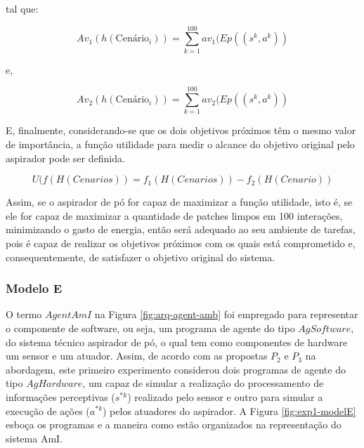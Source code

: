 tal que:

\[
Av_1(h(\textrm{Cenário}_i)) =  \sum_{k=1}^{100}av_1(Ep((s^k, a^k))
\]

e, 

\[
Av_2(h(\textrm{Cenário}_i)) = \sum_{k=1}^{100}av_2(Ep((s^k, a^k))
\]

E, finalmente, considerando-se que os dois objetivos próximos têm o mesmo valor de importância, a função utilidade para medir o alcance do objetivo original pelo aspirador pode ser definida.

\[ U(f(H(Cenarios)) = f_1(H(Cenarios)) - f_2(H(Cenario))\]

Assim, se o aspirador de pó for capaz de maximizar a função utilidade, isto é, se ele for capaz de maximizar a quantidade de patches limpos em 100 interações, minimizando o gasto de energia, então será adequado ao seu ambiente de tarefas, pois é capaz de realizar os objetivos próximos com os quais está comprometido e, consequentemente, de satisfazer o objetivo original do sistema.

\subsubsection{Modelo E}

O termo $AgentAmI$ na Figura \ref{fig:arq-agent-amb} foi empregado para representar o componente de software, ou seja, um programa de agente do tipo $AgSoftware$, do sistema técnico aspirador de pó, o qual tem como componentes de hardware um sensor e um atuador. Assim, de acordo com as propostas $P_2$ e $P_3$ na abordagem, este primeiro experimento considerou dois programas de agente do tipo $AgHardware$, um capaz de simular a realização do processamento de informações perceptivas ($s^{*k}$) realizado pelo sensor e outro para simular a execução de ações ($a^{*k}$) pelos atuadores do aspirador. A Figura \ref{fig:exp1-modelE} esboça os programas e a maneira como estão organizados na representação do sistema AmI.

\begin{figure}[h!]
    \centering
\end{figure}

